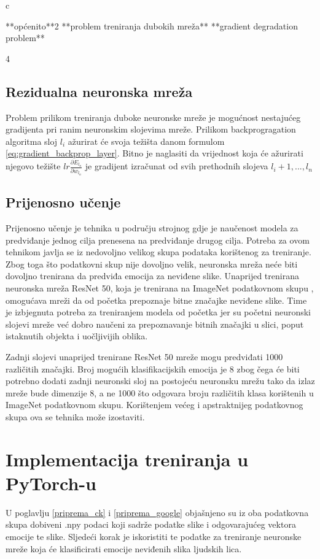 \documentclass[times, utf8, zavrsni,numeric,pstricks]{fer}
\begin{document}
c

**općenito**2
**problem treniranja dubokih mreža**	
**gradient degradation problem**

4
\subsection{Rezidualna neuronska mreža}

Problem prilikom treniranja duboke neuronske mreže je mogućnost nestajućeg gradijenta  pri ranim neuronskim slojevima mreže. Prilikom backprogragation algoritma sloj $l_i$ ažurirat će svoja težišta danom formulom \ref{eq:gradient_backprop_layer}. Bitno je naglasiti da vrijednost koja će ažurirati njegovo težište $lr \frac{\partial E_{l_n}}{\partial w_{l_n}}$ je gradijent izračunat od svih prethodnih slojeva $l_i+1, ..., l_n$


\subsection{Prijenosno učenje}

Prijenosno učenje je tehnika u području strojnog gdje je naučenost modela za predviđanje jednog cilja prenesena na predviđanje drugog cilja. Potreba za ovom tehnikom javlja se iz nedovoljno velikog skupa podataka korištenog za treniranje. Zbog toga što podatkovni skup nije dovoljno velik, neuronska mreža neće biti dovoljno trenirana da predviđa emocija za neviđene slike. Unaprijed trenirana neuronska mreža ResNet 50, koja je trenirana na ImageNet podatkovnom skupu \cite{imagenet_cvpr09}, omogućava mreži da od početka prepoznaje bitne značajke neviđene slike. Time je izbjegnuta potreba za treniranjem modela od početka jer su početni neuronski slojevi mreže već dobro naučeni za prepoznavanje bitnih značajki u slici, poput istaknutih objekta i uočljivijih oblika.

Zadnji slojevi unaprijed trenirane ResNet 50 mreže mogu predviđati 1000 različitih značajki. Broj mogućih klasifikacijskih emocija je 8 zbog čega će biti potrebno dodati zadnji neuronski sloj na postojeću neuronsku mrežu tako da izlaz mreže bude dimenzije 8, a ne 1000 što odgovara broju različitih klasa korištenih u ImageNet podatkovnom skupu. Korištenjem većeg i apstraktnijeg podatkovnog skupa ova se tehnika može izostaviti.

\section{Implementacija treniranja u PyTorch-u}
U poglavlju \ref{priprema_ck} i \ref{priprema_google} objašnjeno su iz oba podatkovna skupa dobiveni .npy podaci koji sadrže podatke slike i odgovarajućeg vektora emocije te slike. Sljedeći korak je iskoristiti te podatke za treniranje neuronske mreže koja će klasificirati emocije neviđenih slika ljudskih lica.
\end{document}
